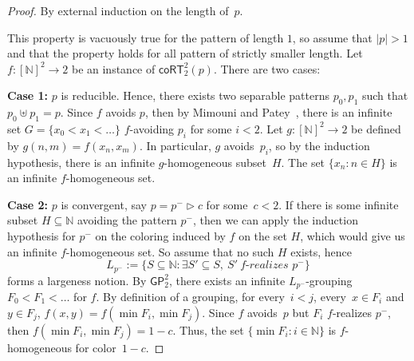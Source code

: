 \documentclass{article}
\numberwithin{theorem}{section}
\newtheorem{proposition}[theorem]{Proposition}
\newcommand{\ludovic}[1]{\textcolor{blue}{#1}}
\newcommand{\quentin}[1]{\textcolor{green}{#1}}
\newcommand{\RCA}[0]{\mathsf{RCA}}
\newcommand{\GP}{\mathsf{GP}}
\newcommand{\coRT}[0]{\mathsf{coRT}}
\newcommand{\NN}[0]{\mathbb{N}}
\begin{document}
\begin{proof}
By external induction on the length of~$p$.

This property is vacuously true for the pattern of length $1$, so assume that $|p| > 1$ and that the property holds for all pattern of strictly smaller length.
Let $f : [\NN]^2 \to 2$ be an instance of $\coRT^2_2(p)$. There are two cases:
\smallskip

\textbf{Case 1:} $p$ is reducible. Hence, there exists two separable patterns $p_0,p_1$ such that $p_0 \uplus p_1 = p$. Since $f$ avoids $p$, then by Mimouni and Patey~\cite{mimouni2025ramseylike}, there is an infinite set $G = \{ x_0 < x_1 < \dots \}$ $f$-avoiding $p_i$ for some $i < 2$. Let $g : [\NN]^2 \to 2$ be defined by $g(n, m) = f(x_n, x_m)$. In particular, $g$ avoids~$p_i$, so by the induction hypothesis, there is an infinite $g$-homogeneous subset~$H$. The set $\{ x_n : n \in H \}$ is an infinite $f$-homogeneous set.
\smallskip

\textbf{Case 2:} $p$ is convergent, say $p = p^- \rhd c$ for some~$c < 2$. If there is some infinite subset $H \subseteq \NN$ avoiding the pattern $p^-$, then we can apply the induction hypothesis for $p^-$ on the coloring induced by $f$ on the set $H$, which would give us an infinite $f$-homogeneous set.
So assume that no such $H$ exists, hence 
$$L_{p^-} := \{S \subseteq \NN : \exists S' \subseteq S,\ S'~ f\textit{-realizes } p^-\}$$ forms a largeness notion. By $\GP_2^2$, there exists an infinite $L_{p^-}$-grouping $F_0 < F_1 < \dots$ for $f$. By definition of a grouping, for every~$i < j$, every~$x \in F_i$ and $y \in F_j$, $f(x, y) = f(\min F_i, \min F_j)$. Since $f$ avoids~$p$ but $F_i$ $f$-realizes $p^-$, then $f(\min F_i, \min F_j) = 1-c$. Thus, the set $\{ \min F_i : i \in \NN \}$ is $f$-homogeneous for color~$1 - c$. %
\end{proof}
\end{document}
